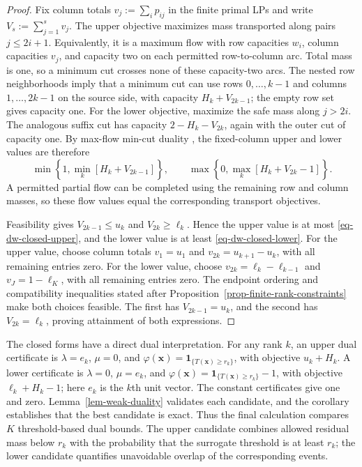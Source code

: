 \documentclass[review,11pt,3p,authoryear,nopreprintline]{elsarticle}
\begin{document}
\begin{proof}
  Fix column totals $v_j:=\sum_i p_{ij}$ in the finite primal LPs and write $V_s:=\sum_{j=1}^s v_j$. The upper objective maximizes mass transported along pairs $j\le2i+1$. Equivalently, it is a maximum flow with row capacities $w_i$, column capacities $v_j$, and capacity two on each permitted row-to-column arc. Total mass is one, so a minimum cut crosses none of these capacity-two arcs. The nested row neighborhoods imply that a minimum cut can use rows $0,\ldots,k-1$ and columns $1,\ldots,2k-1$ on the source side, with capacity $H_k+V_{2k-1}$; the empty row set gives capacity one. For the lower objective, maximize the safe mass along $j>2i$. The analogous suffix cut has capacity $2-H_k-V_{2k}$, again with the outer cut of capacity one. By max-flow min-cut duality \citep{F.F56}, the fixed-column upper and lower values are therefore
  \[
    \min\left\{1,\min_k\left[H_k+V_{2k-1}\right]\right\},\qquad
    \max\left\{0,\max_k\left[H_k+V_{2k}-1\right]\right\}.
  \]
  A permitted partial flow can be completed using the remaining row and column masses, so these flow values equal the corresponding transport objectives.

  Feasibility gives $V_{2k-1}\le u_k$ and $V_{2k}\ge\ell_k$. Hence the upper value is at most \eqref{eq-dw-closed-upper}, and the lower value is at least \eqref{eq-dw-closed-lower}. For the upper value, choose column totals $v_1=u_1$ and $v_{2k}=u_{k+1}-u_k$, with all remaining entries zero. For the lower value, choose $v_{2k}=\ell_k-\ell_{k-1}$ and $v_J=1-\ell_K$, with all remaining entries zero. The endpoint ordering and compatibility inequalities stated after Proposition~\ref{prop-finite-rank-constraints} make both choices feasible. The first has $V_{2k-1}=u_k$, and the second has $V_{2k}=\ell_k$, proving attainment of both expressions.
\end{proof}

The closed forms have a direct dual interpretation. For any rank $k$, an upper dual certificate is $\lambda=e_k$, $\mu=0$, and $\varphi(\bm x)=\mathbf1_{\{T(\bm x)\ge r_k\}}$, with objective $u_k+H_k$. A lower certificate is $\lambda=0$, $\mu=e_k$, and $\varphi(\bm x)=\mathbf1_{\{T(\bm x)\ge r_k\}}-1$, with objective $\ell_k+H_k-1$; here $e_k$ is the $k$th unit vector. The constant certificates give one and zero. Lemma~\ref{lem-weak-duality} validates each candidate, and the corollary establishes that the best candidate is exact. Thus the final calculation compares $K$ threshold-based dual bounds. The upper candidate combines allowed residual mass below $r_k$ with the probability that the surrogate threshold is at least $r_k$; the lower candidate quantifies unavoidable overlap of the corresponding events.
\end{document}
